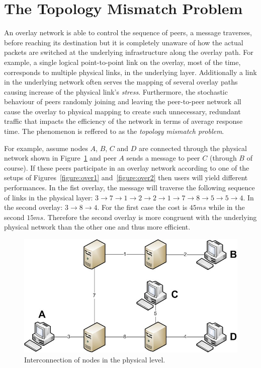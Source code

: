 \documentclass[a4paper,10pt]{article}
\begin{document}
\section{The Topology Mismatch Problem}

An overlay network is able to control the sequence of peers, a message traverses, before reaching its destination but it is completely unaware of how the actual packets are switched at the underlying infrastructure along the overlay path. For example, a single logical point-to-point link on the overlay, most of the time, corresponds to multiple physical links, in the underlying layer. Additionally a link in the underlying network often serves the mapping of several overlay paths causing increase of the physical link's \emph{stress}\cite{chu_esm_2002}.  Furthermore, the stochastic behaviour of peers randomly joining and leaving the peer-to-peer network all cause the overlay to physical mapping to create such unnecessary, redundant traffic that impacts the efficiency of the network in terms of average response time. The phenomenon is reffered to as the \emph{topology mismatch problem}.

For example, assume nodes $A$, $B$, $C$ and $D$ are connected through the physical network shown in Figure~\ref{figure:phys} and peer $A$ sends a message to peer $C$ (through $B$ of course). If these peers participate in an overlay network according to one of the setups of Figures~\ref{figure:over1} and~\ref{figure:over2} then users will yield different performances. In the fist overlay, the message will traverse the following sequence of links in the physical layer: $3 \rightarrow 7 \rightarrow 1 \rightarrow 2 \rightarrow 2 \rightarrow 1 \rightarrow 7 \rightarrow 8 \rightarrow 5 \rightarrow 5 \rightarrow 4$. In the second overlay: $3 \rightarrow 8 \rightarrow 4$. For the first case the cost is $45 ms$ while in the second $15 ms$. Therefore the second overlay is more congruent with the underlying physical network than the other one and thus more efficient.

\begin{figure}
\centering
  \includegraphics[scale=0.4]{img/phys.jpeg}
\caption{Interconnection of nodes in the physical level.}
\label{figure:phys}
\end{figure}
\end{document}
